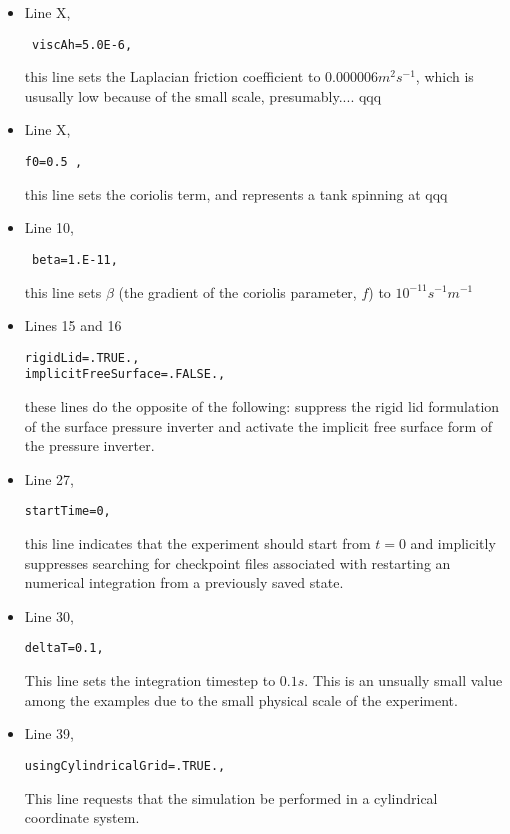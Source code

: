 \begin{itemize}

\item Line X, \begin{verbatim} viscAh=5.0E-6, \end{verbatim} this line sets
the Laplacian friction coefficient to $0.000006 m^2s^{-1}$, which is ususally 
low because of the small scale, presumably.... qqq

\item Line X, \begin{verbatim}f0=0.5 , \end{verbatim} this line sets the 
coriolis term, and represents a tank spinning at qqq
\item Line 10, \begin{verbatim} beta=1.E-11, \end{verbatim} this line sets
$\beta$ (the gradient of the coriolis parameter, $f$) to $10^{-11} s^{-1}m^{-1}$

\item Lines 15 and 16
\begin{verbatim}
rigidLid=.TRUE.,
implicitFreeSurface=.FALSE.,
\end{verbatim}

these lines do the opposite of the following: 
suppress the rigid lid formulation of the surface
pressure inverter and activate the implicit free surface form
of the pressure inverter.

\item Line 27,
\begin{verbatim}
startTime=0,
\end{verbatim}
this line indicates that the experiment should start from $t=0$
and implicitly suppresses searching for checkpoint files associated
with restarting an numerical integration from a previously saved state.

\item Line 30,
\begin{verbatim}
deltaT=0.1,
\end{verbatim}
This line sets the integration timestep to $0.1s$.  This is an unsually
small value among the examples due to the small physical scale of the 
experiment.

\item Line 39,
\begin{verbatim}
usingCylindricalGrid=.TRUE.,
\end{verbatim}
This line requests that the simulation be performed in a 
cylindrical coordinate system.


\end{itemize}
